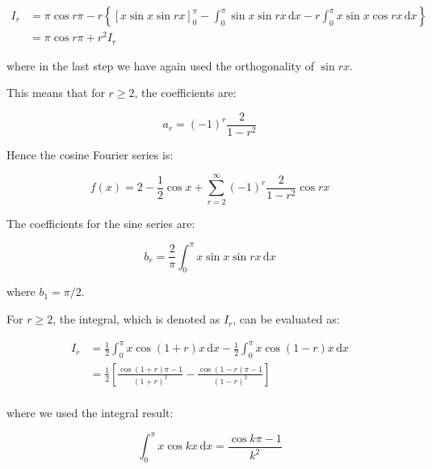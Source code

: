 \documentclass[12pt]{article}
\begin{document}
\begin{equation}
\begin{split}
    I_{r} &= \pi \cos{r\pi} - r \left\{ \left[ x \sin{x} \sin{rx} \right]_{0}^{\pi} - \int_{0}^{\pi} \sin{x} \sin{rx} \, \mathrm{d}x - r \int_{0}^{\pi} x \sin{x} \cos{rx} \, \mathrm{d}x \right\} \\
    &= \pi \cos{r\pi} + r^{2} I_{r}
\end{split}
\end{equation}

where in the last step we have again used the orthogonality of $\sin{rx}$.

This means that for $r \ge 2$, the coefficients are:

\begin{equation}
    a_{r} = (-1)^{r} \frac{2}{1 - r^{2}}
\end{equation}

Hence the cosine Fourier series is:

\begin{equation}
    f(x) = 2 - \frac{1}{2} \cos{x} + \sum_{r = 2}^{\infty} (-1)^{r} \frac{2}{1 - r^{2}} \cos{rx}
\end{equation}

The coefficients for the sine series are:

\begin{equation}
    b_{r} = \frac{2}{\pi} \int_{0}^{\pi} x \sin{x} \sin{rx} \, \mathrm{d}x
\end{equation}

where $b_{1} = \pi/2$.

For $r \ge 2$, the integral, which is denoted as $I_{r}$, can be evaluated as:

\begin{equation}
\begin{split}
    I_{r} &= \frac{1}{2} \int_{0}^{\pi} x \cos{(1 + r)x} \, \mathrm{d}x - \frac{1}{2} \int_{0}^{\pi} x \cos{(1 - r)x} \, \mathrm{d}x \\
    &= \frac{1}{2} \left[ \frac{\cos{(1 + r)\pi} - 1}{(1 + r)^{2}} - \frac{\cos{(1 - r)\pi} - 1}{(1 - r)^{2}} \right] \\
\end{split}
\end{equation}

where we used the integral result:

\begin{equation}
    \int_{0}^{\pi} x \cos{kx} \, \mathrm{d}x = \frac{\cos{k\pi} - 1}{k^{2}}
\end{equation}
\end{document}
